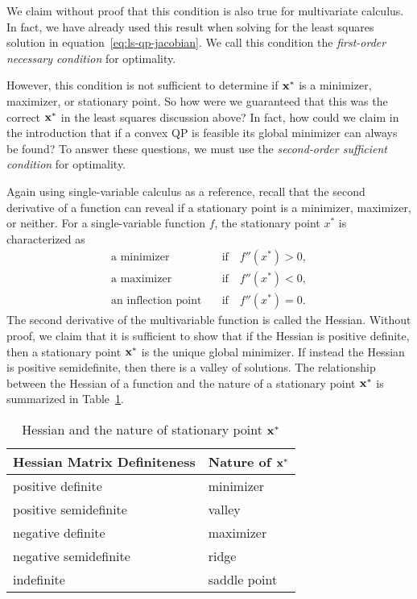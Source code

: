 \documentclass[10pt]{article}
\begin{document}
We claim without proof that this condition is also true for multivariate calculus.
In fact, we have already used this result when solving for the least squares solution in equation~\eqref{eq:ls-qp-jacobian}.
We call this condition the \textit{first-order necessary condition} for optimality.

However, this condition is not sufficient to determine if $\mathbf{x}^*$ is a minimizer, maximizer, or stationary point.
So how were we guaranteed that this was the correct $\mathbf{x}^*$ in the least squares discussion above?
In fact, how could we claim in the introduction that if a convex QP is feasible its global minimizer can always be found?
To answer these questions, we must use the \textit{second-order sufficient condition} for optimality.

Again using single-variable calculus as a reference, recall that the second derivative of a function can reveal if a stationary point is a minimizer, maximizer, or neither.
For a single-variable function $f$, the stationary point $x^*$ is characterized as
\begin{align*}
\text{a minimizer}\quad &\text{if}\quad f''(x^*) > 0, \\
\text{a maximizer}\quad &\text{if}\quad f''(x^*) < 0, \\
\text{an inflection point}\quad &\text{if}\quad f''(x^*) = 0.
\end{align*}
The second derivative of the multivariable function is called the Hessian.
Without proof, we claim that it is sufficient to show that if the Hessian is positive definite, then a stationary point $\mathbf{x}^*$ is the unique global minimizer.
If instead the Hessian is positive semidefinite, then there is a valley of solutions.
The relationship between the Hessian of a function and the nature of a stationary point $\mathbf{x}^*$ is summarized in Table~\ref{tbl:hessian}.
\begin{table}
\centering
\caption{Hessian and the nature of stationary point $\mathbf{x}^*$}
\label{tbl:hessian}
\begin{tabular}{@{} ll @{}} \toprule
Hessian Matrix Definiteness & Nature of $\mathbf{x}^*$ \\\midrule
positive definite & minimizer \\
positive semidefinite & valley \\
negative definite & maximizer \\
negative semidefinite & ridge \\
indefinite & saddle point
\end{tabular}
\end{table}
\end{document}
